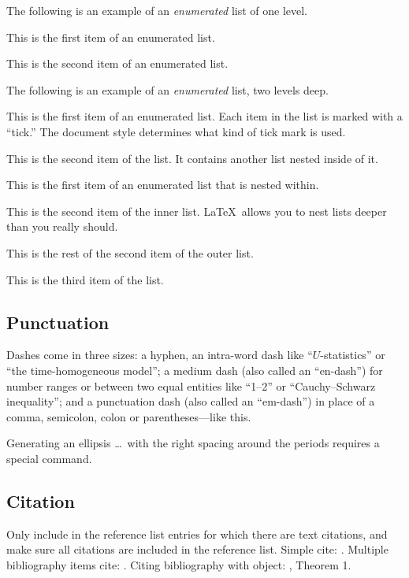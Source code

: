 \documentclass[aos]{imsart}
\theoremstyle{plain}
\theoremstyle{definition}
\begin{document}
The following is an example of an \emph{enumerated} list of one level.

\begin{longlist}
\item This is the first item of an enumerated list.
\item This is the second item of an enumerated list.
\end{longlist}

The following is an example of an \emph{enumerated} list, two levels deep.
\begin{longlist}
\item[1.]
This is the first item of an enumerated list.  Each item
in the list is marked with a ``tick.''  The document
style determines what kind of tick mark is used.
\item[2.]
This is the second item of the list.  It contains another
list nested inside of it.
\begin{longlist}
\item
This is the first item of an enumerated list that
is nested within.
\item
This is the second item of the inner list.  \LaTeX\
allows you to nest lists deeper than you really should.
\end{longlist}
This is the rest of the second item of the outer list.
\item[3.]
This is the third item of the list.
\end{longlist}

\subsection{Punctuation}
Dashes come in three sizes: a hyphen, an intra-word dash like ``$U$-statistics'' or ``the time-homogeneous model'';
a medium dash (also called an ``en-dash'') for number ranges or between two equal entities like ``1--2'' or ``Cauchy--Schwarz inequality'';
and a punctuation dash (also called an ``em-dash'') in place of a comma, semicolon,
colon or parentheses---like this.

Generating an ellipsis \ldots\ with the right spacing
around the periods requires a special command.

\subsection{Citation}
Only include in the reference list entries for which there are text citations,
and make sure all citations are included in the reference list.
Simple cite: \cite{r1}.
Multiple bibliography items cite: \cite{r1,r2,r3,r4}.
Citing bibliography with object: \cite{r1}, Theorem 1.
\end{document}
